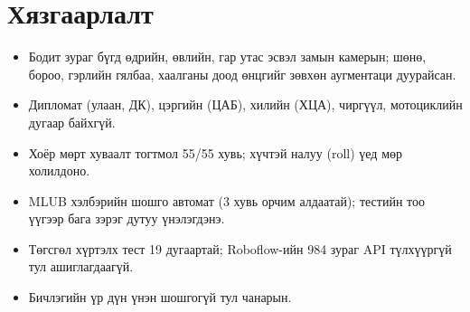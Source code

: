 \section{Хязгаарлалт}
\begin{itemize}[leftmargin=2em]
\item Бодит зураг бүгд өдрийн, өвлийн, гар утас эсвэл замын камерын; шөнө, бороо, гэрлийн гялбаа, хаалганы доод өнцгийг зөвхөн аугментаци дуурайсан.
\item Дипломат (улаан, ДК), цэргийн (ЦАБ), хилийн (ХЦА), чиргүүл, мотоциклийн дугаар байхгүй.
\item Хоёр мөрт хуваалт тогтмол 55/55 хувь; хүчтэй налуу (roll) үед мөр холилдоно.
\item MLUB хэлбэрийн шошго автомат (3 хувь орчим алдаатай); тестийн тоо үүгээр бага зэрэг дутуу үнэлэгдэнэ.
\item Төгсгөл хүртэлх тест 19 дугаартай; Roboflow-ийн 984 зураг API түлхүүргүй тул ашиглагдаагүй.
\item Бичлэгийн үр дүн үнэн шошгогүй тул чанарын.
\end{itemize}

